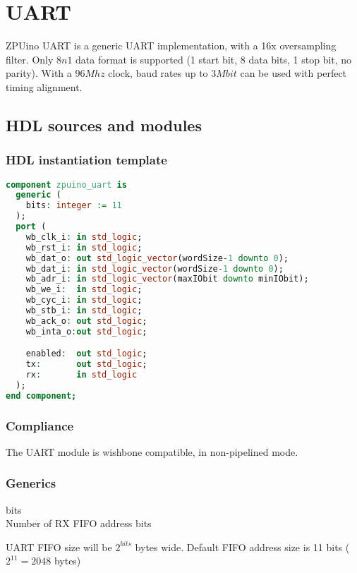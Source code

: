 \section{UART}

ZPUino UART is a generic UART implementation, with a 16x oversampling filter. Only $8n1$ 
data format is supported (1 start bit, 8 data bits, 1 stop bit, no
parity). With a $96Mhz$ clock, baud rates up to $3Mbit$ can be used with perfect timing alignment.
\subsection{HDL sources and modules}

\subsubsection{HDL instantiation template}

\begin{lstlisting}[language=VHDL]
component zpuino_uart is
  generic (
    bits: integer := 11
  );
  port (
    wb_clk_i: in std_logic;
    wb_rst_i: in std_logic;
    wb_dat_o: out std_logic_vector(wordSize-1 downto 0);
    wb_dat_i: in std_logic_vector(wordSize-1 downto 0);
    wb_adr_i: in std_logic_vector(maxIObit downto minIObit);
    wb_we_i:  in std_logic;
    wb_cyc_i: in std_logic;
    wb_stb_i: in std_logic;
    wb_ack_o: out std_logic;
    wb_inta_o:out std_logic;

    enabled:  out std_logic;
    tx:       out std_logic;
    rx:       in std_logic
  );
end component;
\end{lstlisting}



\subsubsection{Compliance}
The UART module is wishbone compatible, in non-pipelined mode.





\subsubsection{Generics}

\begin{description}
\item{bits} \hfill \\ Number of RX FIFO address bits
\end{description}
UART FIFO size will be $2^{bits}$ bytes wide. Default FIFO address size is 11 bits ($2^{11}=2048$ bytes)


